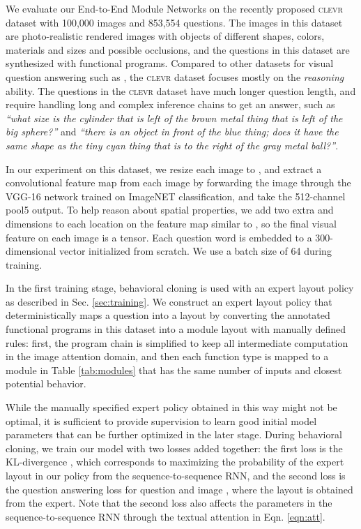 \documentclass[10pt,twocolumn,letterpaper]{article}
\newcommand{\clevr}{\textsc{clevr}\xspace}
\begin{document}
We evaluate our End-to-End Module Networks on the recently proposed \clevr dataset \cite{johnson2017clevr} with 100,000 images and 853,554 questions. The images in this dataset are photo-realistic rendered images with objects of different shapes, colors, materials and sizes and possible occlusions, and the questions in this dataset are synthesized with functional programs. Compared to other datasets for visual question answering such as \cite{antol15iccv}, the \textsc{clevr} dataset focuses mostly on the \textit{reasoning} ability. The questions in the \clevr dataset have much longer question length, and require handling long and complex inference chains to get an answer, such as \textit{``what size is the cylinder that is left of the brown metal thing that is left of the big sphere?''} and \textit{``there is an object in front of the blue thing; does it have the same shape as the tiny cyan thing that is to the right of the gray metal ball?''}.

In our experiment on this dataset, we resize each image to , and extract a  convolutional feature map from each image by forwarding the image through the VGG-16 network \cite{simonyan2015very} trained on ImageNET classification, and take the 512-channel pool5 output. To help reason about spatial properties, we add two extra  and  dimensions to each location  on the feature map similar to \cite{hu2016segmentation}, so the final visual feature  on each image is a  tensor. Each question word is embedded to a 300-dimensional vector initialized from scratch. We use a batch size of 64 during training.

In the first training stage, behavioral cloning is used with an expert layout policy as described in Sec. \ref{sec:training}. We construct an expert layout policy  that deterministically maps a question  into a layout  by converting the annotated functional programs in this dataset into a module layout with manually defined rules: first, the program chain is simplified to keep all intermediate computation in  the image attention domain, and then each function type is mapped to a module in Table \ref{tab:modules} that has the same number of inputs and closest potential behavior.

While the manually specified expert policy  obtained in this way might not be optimal, it is sufficient to provide supervision to learn good initial model parameters that can be further optimized in the later stage. During behavioral cloning, we train our model with two losses added together: the first loss is the KL-divergence , which corresponds to maximizing the probability of the expert layout  in our policy  from the sequence-to-sequence RNN, and the second loss is the question answering loss  for question  and image , where the layout  is obtained from the expert. Note that the second loss  also affects the parameters in the sequence-to-sequence RNN through the textual attention in Eqn. \ref{eqn:att}.
\end{document}
